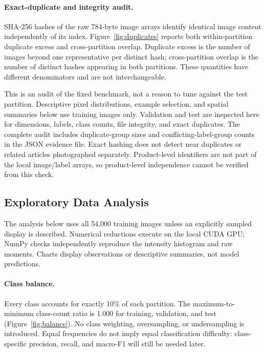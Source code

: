 \paragraph{Exact-duplicate and integrity audit.}
SHA-256 hashes of the raw 784-byte image arrays identify identical image
content independently of its index. Figure~\ref{fig:duplicates} reports both
within-partition duplicate excess and cross-partition overlap. Duplicate excess
is the number of images beyond one representative per distinct hash;
cross-partition overlap is the number of distinct hashes appearing in both
partitions. These quantities have different denominators and are not
interchangeable.


This is an audit of the fixed benchmark, not a reason to tune against the test
partition. Descriptive pixel distributions, example selection, and spatial
summaries below use training images only. Validation and test are inspected
here for dimensions, labels, class counts, file integrity, and exact duplicates.
The complete audit includes duplicate-group sizes and conflicting-label-group
counts in the JSON evidence file. Exact hashing does not detect near duplicates
or related articles photographed separately. Product-level identifiers are
not part of the local image/label arrays, so product-level independence cannot
be verified from this check.
\FloatBarrier

\subsection{Exploratory Data Analysis}
\label{sec:eda}
The analysis below uses all 54,000 training images unless an explicitly sampled
display is described. Numerical reductions execute on the local CUDA GPU;
NumPy checks independently reproduce the intensity histogram and raw moments.
Charts display observations or descriptive summaries, not model predictions.

\paragraph{Class balance.}
Every class accounts for exactly 10\% of each partition. The maximum-to-minimum
class-count ratio is 1.000 for training, validation, and test
(Figure~\ref{fig:balance}). No class weighting, oversampling, or undersampling
is introduced. Equal frequencies do not imply equal classification difficulty:
class-specific precision, recall, and macro-F1 will still be needed later.

